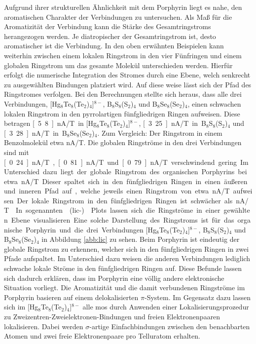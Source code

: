 Aufgrund ihrer strukturellen Ähnlichkeit mit dem Porphyrin liegt es nahe, den aromatischen Charakter der Verbindungen zu untersuchen. Als Maß für die Aromatizität der Verbindung kann die Stärke des Gesamtringstroms herangezogen werden. Je diatropischer der Gesamtringstrom ist, desto aromatischer ist die Verbindung. In den oben erwähnten Beispielen kann weiterhin zwischen einem lokalen Ringstrom in den vier Fünfringen und einem globalen Ringstrom um das gesamte Molekül unterschieden werden. Hierfür erfolgt die numerische Integration des Stromes durch eine Ebene, welch senkrecht zu ausgewählten Bindungen platziert wird. Auf diese weise lässt sich der Pfad des Ringstromes verfolgen. Bei den Berechnungen stellte sich heraus, dass alle drei Verbindungen, $[$Hg$_8$Te$_8$(Te$_2$)$_4$]$^{8-}$, B$_8$S$_8$(S$_2$)$_4$ und B$_8$Se$_8$(Se$_2$)$_4$, einen schwachen lokalen Ringstrom in den pyrrolartigen fünfgliedrigen Ringen aufweisen. Diese betragen \unit[5.8]{nA/T} in $[$Hg$_8$Te$_8$(Te$_2$)$_4$]$^{8-}$, \unit[3.25]{nA/T} in B$_8$S$_8$(S$_2$)$_4$ und \unit[3.28]{nA/T} in B$_8$Se$_8$(Se$_2$)$_4$. Zum Vergleich: Der Ringstrom in einem Benzolmolekül etwa \unit[12]{nA/T}.\supercite{fliegl2012aromatic} Die globalen Ringströme in den drei Verbindungen sind mit \unit[0.24]{nA/T}, \unit[0.81]{nA/T} und \unit[0.79]{nA/T} verschwindend gering. Im Unterschied dazu liegt der globale Ringstrom des organischen Porphyrins bei etwa \unit[27]{nA/T}. Dieser spaltet sich in den fünfgliedrigen Ringen in einen äußeren und inneren Pfad auf, welche jeweils einen Ringstrom von etwa \unit[13]{nA/T} aufweisen. Der lokale Ringstrom in den fünfgliedrigen Ringen ist schwächer als \unit[1]{nA/T}.\supercite{fliegl2012aromatic} In sogenannten \mbox{(\acs{lic}-)}Plots lassen sich die Ringströme in einer gewählten Ebene visualisieren. Eine solche Darstellung des Ringstroms ist für das organische Porphyrin und die drei Verbindungen $[$Hg$_8$Te$_8$(Te$_2$)$_4$]$^{8-}$, B$_8$S$_8$(S$_2$)$_4$ und B$_8$Se$_8$(Se$_2$)$_4$ in Abbildung \ref{abb:lic} zu sehen. Beim Porphyrin ist eindeutig der globale Ringstrom zu erkennen, welcher sich in den fünfgliedrigen Ringen in zwei Pfade aufspaltet. Im Unterschied dazu weisen die anderen Verbindungen lediglich schwache lokale Ströme in den fünfgliedrigen Ringen auf.
Diese Befunde lassen sich dadurch erklären, dass im Porphyrin eine völlig andere elektronische Situation vorliegt. Die Aromatizität und die damit verbundenen Ringströme im Porphyrin basieren auf einem delokalisierten $\pi$-System. Im Gegensatz dazu lassen sich im $[$Hg$_8$Te$_8$(Te$_2$)$_4$]$^{8-}$ alle \acp{mo} durch Anwenden einer Lokalisierungsprozedur\supercite{boys1960sf} zu Zweizentren-Zweielektronen-Bindungen und freien Elektronenpaaren lokalisieren. Dabei werden $\sigma$-artige Einfachbindungen zwischen den benachbarten Atomen und zwei freie Elektronenpaare pro Telluratom erhalten. 

